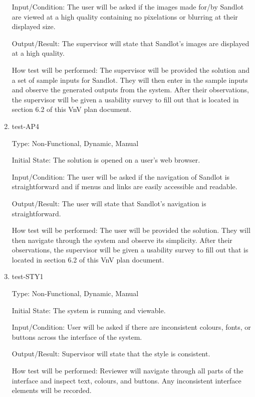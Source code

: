 \documentclass[12pt, titlepage]{article}
\begin{document}
\begin{enumerate}
Input/Condition: The user will be asked if the images made for/by Sandlot are viewed at
a high quality containing no pixelations or blurring at their displayed size.

Output/Result: The supervisor will state that Sandlot's images are displayed at a high
quality.

How test will be performed: The supervisor will be provided the solution and a set of
sample inputs for Sandlot. They will then enter in the sample inputs and observe the
generated outputs from the system. After their observations, the supervisor will be given
a usability survey to fill out that is located in section 6.2 of this VnV plan document.

\item{test-AP4\\}

Type: Non-Functional, Dynamic, Manual
					
Initial State: The solution is opened on a user's web browser.
					
Input/Condition: The user will be asked if the navigation of Sandlot is straightforward 
and if menus and links are easily accessible and readable.
					
Output/Result: The user will state that Sandlot's navigation is straightforward.
					
How test will be performed: The user will be provided the solution. They will then 
navigate through the system and observe its simplicity. After their observations, 
the supervisor will be given a usability survey to fill out that is located in 
section 6.2 of this VnV plan document.

\item{test-STY1\\}

Type: Non-Functional, Dynamic, Manual
					
Initial State: The system is running and viewable.
					
Input/Condition: User will be asked if there are inconsistent colours,
fonts, or buttons across the interface of the system.
					
Output/Result: Supervisor will state that the style is consistent.
					
How test will be performed: Reviewer will navigate through all parts
of the interface and inspect text, colours, and buttons. Any 
inconsistent interface elements will be recorded. 

\end{enumerate}
\end{document}
